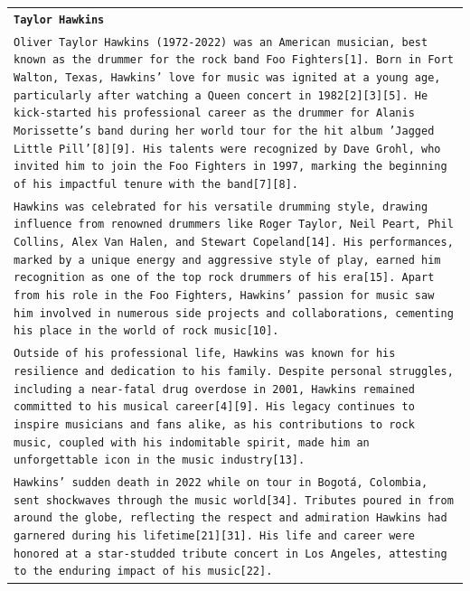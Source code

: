 \onecolumn
\renewcommand{\arraystretch}{1.5} %
\begin{longtable}{p{\textwidth}}
\toprule
\texttt{\small{\textbf{Taylor Hawkins}}} \\
\texttt{\small{Oliver Taylor Hawkins (1972-2022) was an American musician, best known as the drummer for the rock band Foo Fighters[1]. Born in Fort Walton, Texas, Hawkins' love for music was ignited at a young age, particularly after watching a Queen concert in 1982[2][3][5]. He kick-started his professional career as the drummer for Alanis Morissette’s band during her world tour for the hit album 'Jagged Little Pill'[8][9]. His talents were recognized by Dave Grohl, who invited him to join the Foo Fighters in 1997, marking the beginning of his impactful tenure with the band[7][8].}} \\
\texttt{\small{Hawkins was celebrated for his versatile drumming style, drawing influence from renowned drummers like Roger Taylor, Neil Peart, Phil Collins, Alex Van Halen, and Stewart Copeland[14]. His performances, marked by a unique energy and aggressive style of play, earned him recognition as one of the top rock drummers of his era[15]. Apart from his role in the Foo Fighters, Hawkins' passion for music saw him involved in numerous side projects and collaborations, cementing his place in the world of rock music[10].}} \\
\texttt{\small{Outside of his professional life, Hawkins was known for his resilience and dedication to his family. Despite personal struggles, including a near-fatal drug overdose in 2001, Hawkins remained committed to his musical career[4][9]. His legacy continues to inspire musicians and fans alike, as his contributions to rock music, coupled with his indomitable spirit, made him an unforgettable icon in the music industry[13].}} \\
\texttt{\small{Hawkins' sudden death in 2022 while on tour in Bogotá, Colombia, sent shockwaves through the music world[34]. Tributes poured in from around the globe, reflecting the respect and admiration Hawkins had garnered during his lifetime[21][31]. His life and career were honored at a star-studded tribute concert in Los Angeles, attesting to the enduring impact of his music[22].}} \\


\end{longtable}
